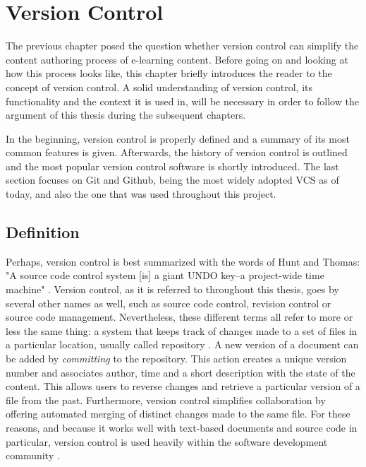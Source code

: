 \chapter{Version Control} \label{chapter:version-control}
The previous chapter posed the question whether version control can simplify the content authoring process of e-learning content. Before going on and looking at how this process looks like, this chapter briefly introduces the reader to the concept of version control. A solid understanding of version control, its functionality and the context it is used in, will be necessary in order to follow the argument of this thesis during the subsequent chapters.

In the beginning, version control is properly defined and a summary of its most common features is given. Afterwards, the history of version control is outlined and the most popular version control software is shortly introduced. The last section focuses on Git and Github, being the most widely adopted VCS as of today, and also the one that was used throughout this project.

\section{Definition}
Perhaps, version control is best summarized with the words of Hunt and Thomas: "A source code control system [is] a giant UNDO key–a project-wide time machine" \cite{hunt_pragmatic_1999}. Version control, as it is referred to throughout this thesis, goes by several other names as well, such as source code control, revision control or source code management. Nevertheless, these different terms all refer to more or less the same thing: a system that keeps track of changes made to a set of files in a particular location, usually called repository \cite{ruparelia_history_2010}. A new version of a document can be added by \textit{committing} to the repository. This action creates a unique version number and associates author, time and a short description with the state of the content. This allows users to reverse changes and retrieve a particular version of a file from the past. Furthermore, version control simplifies collaboration by offering automated merging of distinct changes made to the same file. For these reasons, and because it works well with text-based documents and source code in particular, version control is used heavily within the software development community \cite{_stack_2015}.


